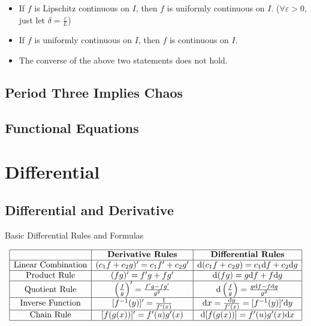 \documentclass[11pt]{../../TexTemplate/elegantbook}
\begin{document}
\begin{remark}
    \begin{itemize}
        \item If \(f\) is Lipschitz continuous on \(I\), then \(f\) is uniformly continuous on \(I\).
            (\(\forall \varepsilon > 0\), just let \(\delta = \frac{\varepsilon}{L}\))
        \item If \(f\) is uniformly continuous on \(I\), then \(f\) is continuous on \(I\).
        \item The converse of the above two statements does not hold.
    \end{itemize}
\end{remark}




\section{Period Three Implies Chaos}



\section{Functional Equations}

\chapter{Differential}
\section{Differential and Derivative}

\begin{leftbarTitle}{Basic Differential Rules and Formulas}\end{leftbarTitle}
\[
\begin{array}{|c|c|c|}
\hline
 & \textbf{Derivative Rules} & \textbf{Differential Rules} \\
\hline
\text{Linear Combination} & (c_{1}f+c_{2}g)' = c_{1}f' + c_{2}g' & 
    \mathrm{d}(c_{1}f+c_{2}g) = c_{1}\mathrm{d}f + c_{2}\mathrm{d}g \\
\hline
\text{Product Rule} & (fg)' = f'g + fg' & \mathrm{d}(fg) = g\mathrm{d}f + f\mathrm{d}g \\
\hline
\text{Quotient Rule} & \left( \frac{f}{g} \right)' = \frac{f'g - fg'}{g^2} & 
    \mathrm{d}\left( \frac{f}{g} \right) = \frac{g\mathrm{d}f - f\mathrm{d}g}{g^2} \\
\hline
\text{Inverse Function} & [f^{-1}(y)]' = \frac{1}{f'(x)} & \mathrm{d}x = \frac{\mathrm{d}y}{f'(x)} = [f^{-1}(y)]'\mathrm{d}y \\
\hline
\text{Chain Rule} & [f(g(x))]' = f'(u)g'(x) & \mathrm{d}[f(g(x))] = f'(u)g'(x)\mathrm{d}x \\
\hline
\end{array}
\]
\end{document}

